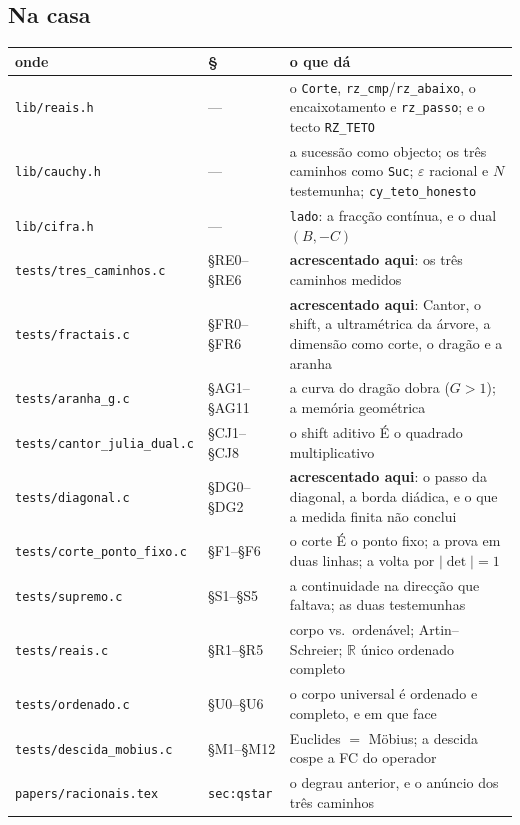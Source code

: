 \documentclass[11pt,a4paper]{article}
\newcommand{\code}[1]{\texttt{\small #1}}
\newcommand{\R}{\mathbb{R}}
\begin{document}
\subsection*{Na casa}

\begin{center}\small
\begin{tabular}{@{}llp{6.8cm}@{}}
\toprule
onde & § & o que dá \\
\midrule
\code{lib/reais.h} & --- & o \code{Corte}, \code{rz\_cmp}/\code{rz\_abaixo}, o encaixotamento e \code{rz\_passo}; e o tecto \code{RZ\_TETO} \\
\code{lib/cauchy.h} & --- & a sucessão como objecto; os três caminhos como \code{Suc}; $\varepsilon$ racional e $N$ testemunha; \code{cy\_teto\_honesto} \\
\code{lib/cifra.h} & --- & \code{lado}: a fracção contínua, e o dual $(B,-C)$ \\
\code{tests/tres\_caminhos.c} & §RE0--§RE6 & \textbf{acrescentado aqui}: os três caminhos medidos \\
\code{tests/fractais.c} & §FR0--§FR6 & \textbf{acrescentado aqui}: Cantor, o shift, a ultramétrica da árvore, a dimensão como corte, o dragão e a aranha \\
\code{tests/aranha\_g.c} & §AG1--§AG11 & a curva do dragão dobra ($G>1$); a memória geométrica \\
\code{tests/cantor\_julia\_dual.c} & §CJ1--§CJ8 & o shift aditivo É o quadrado multiplicativo \\
\code{tests/diagonal.c} & §DG0--§DG2 & \textbf{acrescentado aqui}: o passo da diagonal, a borda diádica, e o que a medida finita não conclui \\
\code{tests/corte\_ponto\_fixo.c} & §F1--§F6 & o corte É o ponto fixo; a prova em duas linhas; a volta por $|\det|=1$ \\
\code{tests/supremo.c} & §S1--§S5 & a continuidade na direcção que faltava; as duas testemunhas \\
\code{tests/reais.c} & §R1--§R5 & corpo vs.\ ordenável; Artin--Schreier; $\R$ único ordenado completo \\
\code{tests/ordenado.c} & §U0--§U6 & o corpo universal é ordenado e completo, e em que face \\
\code{tests/descida\_mobius.c} & §M1--§M12 & Euclides $=$ Möbius; a descida cospe a FC do operador \\
\code{papers/racionais.tex} & \code{sec:qstar} & o degrau anterior, e o anúncio dos três caminhos \\
\bottomrule
\end{tabular}
\end{center}
\end{document}
